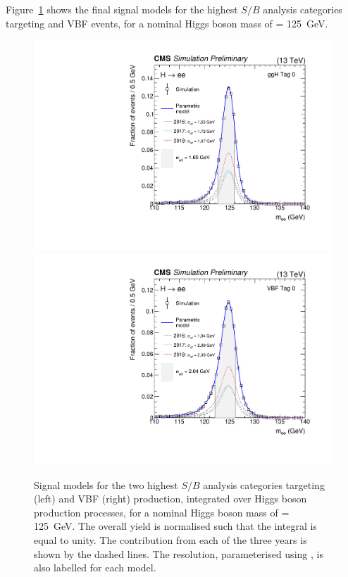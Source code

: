 
Figure~\ref{fig:hee_smodels} shows the final signal models for the highest $S/B$ analysis categories targeting \ggH and VBF events, for a nominal Higgs boson mass of \mH= 125~GeV. 

\begin{figure}[htbp!]
\centering
\includegraphics[width =0.48\linewidth]{Figures/Hee/Results/sigModels/nominal/smodel_gghcat0.pdf}
\includegraphics[width =0.48\linewidth]{Figures/Hee/Results/sigModels/nominal/smodel_vbfcat0.pdf}
\caption[The signal model for the \ggH Tag 0 and VBF Tag 0 analysis categories.]{Signal models for the two highest $S/B$ analysis categories targeting \ggH (left) and VBF (right) production, integrated over Higgs boson production processes, for a nominal Higgs boson mass of \mH= 125~GeV. The overall yield is normalised such that the integral is equal to unity. The contribution from each of the three years is shown by the dashed lines. The resolution, parameterised using \seff, is also labelled for each model.}
\label{fig:hee_smodels}
\end{figure}

